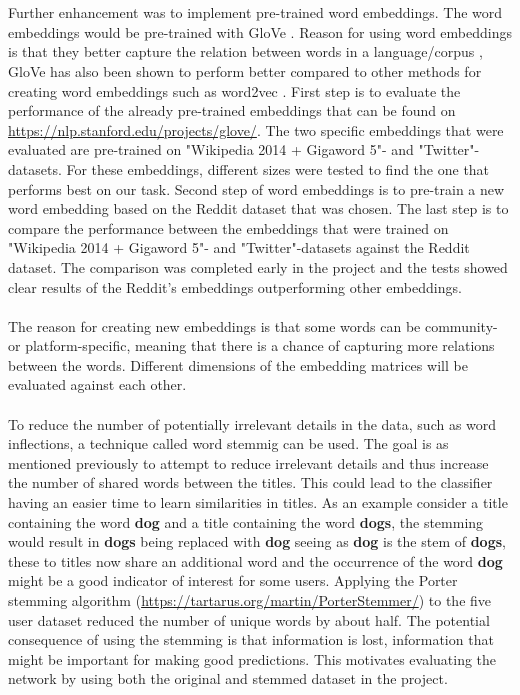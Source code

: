 \\\\
Further enhancement was to implement pre-trained word embeddings. The word embeddings would be pre-trained with GloVe \parencite{pennington2014glove}. Reason for using word embeddings is that they better capture the relation between words in a language/corpus \parencite{mikolov2013linguistic}, GloVe has also been shown to perform better compared to other methods for creating word embeddings such as word2vec \parencite{pennington2014glove}. First step is to evaluate the performance of the already pre-trained embeddings that can be found on \url{https://nlp.stanford.edu/projects/glove/}. The two specific embeddings that were evaluated are pre-trained on "Wikipedia 2014 + Gigaword 5"- and "Twitter"-datasets. For these embeddings, different sizes were tested to find the one that performs best on our task. Second step of word embeddings is to pre-train a new word embedding based on the Reddit dataset that was chosen. The last step is to compare the performance between the embeddings that were trained on "Wikipedia 2014 + Gigaword 5"- and "Twitter"-datasets against the Reddit dataset. The comparison was completed early in the project and the tests showed clear results of the Reddit's embeddings outperforming other embeddings.
\\\\
The reason for creating new embeddings is that some words can be community- or platform-specific, meaning that there is a chance of capturing more relations between the words. Different dimensions of the embedding matrices will be evaluated against each other. 
\\\\
To reduce the number of potentially irrelevant details in the data, such as word inflections, a technique called word stemmig can be used. The goal is as mentioned previously to attempt to reduce irrelevant details and thus increase the number of shared words between the titles. This could lead to the classifier having an easier time to learn similarities in titles. As an example consider a title containing the word \textbf{dog} and a title containing the word \textbf{dogs}, the stemming would result in \textbf{dogs} being replaced with \textbf{dog} seeing as \textbf{dog} is the stem of \textbf{dogs}, these to titles now share an additional word and the occurrence of the word \textbf{dog} might be a good indicator of interest for some users. Applying the Porter stemming algorithm (\url{https://tartarus.org/martin/PorterStemmer/}) to the five user dataset reduced the number of unique words by about half. The potential consequence of using the stemming is that information is lost, information that might be important for making good predictions. This motivates evaluating the network by using both the original and stemmed dataset in the project.
